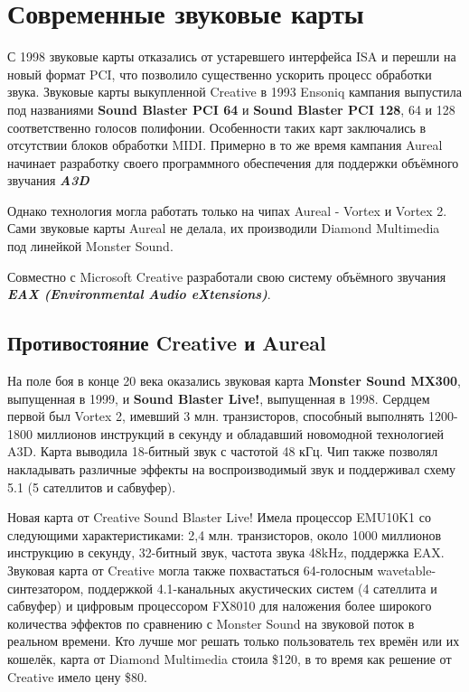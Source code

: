 \documentclass[a4paper,12pt]{extarticle}
\begin{document}
    \section{Современные звуковые карты}
    С 1998 звуковые карты отказались от устаревшего интерфейса ISA и перешли на новый формат PCI, что позволило существенно ускорить процесс обработки звука. Звуковые карты выкупленной Creative в 1993 Ensoniq кампания выпустила под названиями \textbf{Sound Blaster PCI 64} и \textbf{Sound Blaster PCI 128}, 64 и 128 соответственно голосов полифонии. Особенности таких карт заключались в отсутствии блоков обработки MIDI. Примерно в то же время кампания Aureal начинает разработку своего программного обеспечения для поддержки объёмного звучания \textbf{\textit{A3D}}

    Однако технология могла работать только на чипах Aureal - Vortex и Vortex 2. Сами звуковые карты Aureal не делала, их производили Diamond Multimedia под линейкой Monster Sound.

    Совместно с Microsoft Creative разработали свою систему объёмного звучания \textbf{\textit{EAX (Environmental Audio eXtensions)}}.

    \subsection{Противостояние Creative и Aureal}
    На поле боя в конце 20 века оказались звуковая карта \textbf{Monster Sound MX300}, выпущенная в 1999, и \textbf{Sound Blaster Live!}, выпущенная в 1998. Сердцем первой был Vortex 2, имевший 3 млн. транзисторов, способный выполнять 1200-1800 миллионов инструкций в секунду и обладавший новомодной технологией A3D. Карта выводила 18-битный звук с частотой 48 кГц. Чип также позволял накладывать различные эффекты на воспроизводимый звук и поддерживал схему 5.1 (5 сателлитов и сабвуфер).

    Новая карта от Creative Sound Blaster Live! Имела процессор EMU10K1 со следующими характеристиками: 2,4 млн. транзисторов, около 1000 миллионов инструкцию в секунду, 32-битный звук, частота звука 48kHz, поддержка EAX. Звуковая карта от Creative могла также похвастаться 64-голосным wavetable-синтезатором, поддержкой 4.1-канальных акустических систем (4 сателлита и сабвуфер) и цифровым процессором FX8010 для наложения более широкого количества эффектов по сравнению с Monster Sound на звуковой поток в реальном времени. Кто лучше мог решать только пользователь тех времён или их кошелёк, карта от Diamond Multimedia стоила \$120, в то время как решение от Creative имело цену \$80.
\end{document}
